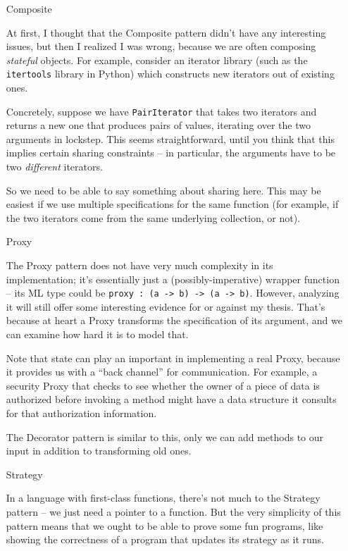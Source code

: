 \begin{itemize}
\item[Composite]

At first, I thought that the Composite pattern didn't have any
interesting issues, but then I realized I was wrong, because we are
often composing \emph{stateful} objects. For example, consider an
iterator library (such as the \texttt{itertools} library in Python)
which constructs new iterators out of existing ones.

Concretely, suppose we have \texttt{PairIterator} that takes two
iterators and returns a new one that produces pairs of values,
iterating over the two arguments in lockstep. This seems
straightforward, until you think that this implies certain sharing
constraints -- in particular, the arguments have to be two
\emph{different} iterators.

So we need to be able to say something about sharing here. This may be
easiest if we use multiple specifications for the same function (for
example, if the two iterators come from the same underlying
collection, or not).

\item[Proxy] 

The Proxy pattern does not have very much complexity in its
implementation; it's essentially just a (possibly-imperative) wrapper
function -- its ML type could be \texttt{proxy : (a -> b) -> (a -> b)}.
However, analyzing it will still offer some interesting evidence for 
or against my thesis. That's because at heart a Proxy transforms 
the specification of its argument, and we can examine how hard it is
to model that. 

Note that state can play an important in implementing a real
Proxy, because it provides us with a ``back channel'' for
communication.  For example, a security Proxy that checks to see
whether the owner of a piece of data is authorized before invoking a
method might have a data structure it consults for that authorization
information.

The Decorator pattern is similar to this, only we can add methods
to our input in addition to transforming old ones. 

\item[Strategy]

In a language with first-class functions, there's not much to the
Strategy pattern -- we just need a pointer to a function. But the very
simplicity of this pattern means that we ought to be able to prove
some fun programs, like showing the correctness of a program that
updates its strategy as it runs.



\end{itemize}
